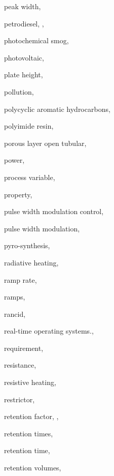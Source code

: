 \begin{theindex}
  \item \lowercase {peak width}, 
  \item \lowercase {petrodiesel}, , 
  \item \lowercase {photochemical smog}, 
  \item \lowercase {photovoltaic}, 
  \item \lowercase {plate height},  
  \item \lowercase {pollution}, 
  \item \lowercase {polycyclic aromatic hydrocarbons}, 
  \item \lowercase {polyimide resin}, 
  \item \lowercase {porous layer open tubular}, 
  \item \lowercase {power}, 
  \item \lowercase {process variable}, 
  \item \lowercase {property}, 
  \item \lowercase {pulse width modulation control}, 
  \item \lowercase {pulse width modulation}, 
  \item \lowercase {pyro-synthesis}, 
  \item \lowercase {radiative heating}, 
  \item \lowercase {ramp rate}, 
  \item \lowercase {ramps}, 
  \item \lowercase {rancid}, 
  \item \lowercase {real-time operating systems.}, 
  \item \lowercase {requirement}, 
  \item \lowercase {resistance}, 
  \item \lowercase {resistive heating}, 
  \item \lowercase {restrictor}, 
  \item \lowercase {retention factor}, , 
  \item \lowercase {retention times}, 
  \item \lowercase {retention time}, 
  \item \lowercase {retention volumes}, 

\end{theindex}
